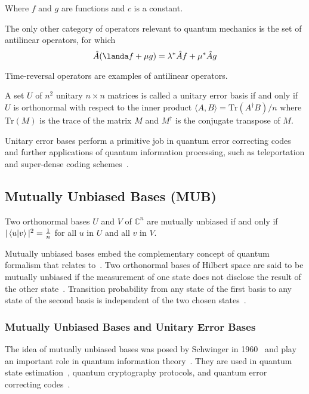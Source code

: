 Where $f$ and $g$ are functions and $c$ is a constant.

The only other category of operators relevant to quantum mechanics is the set of antilinear operators, for which
\begin{equation}
  \hat{A}(\landa f + \mu g) = \lambda^{*}\hat{A}f + \mu^{*}\hat{A}g
  \label{eq:antilinear}
\end{equation}

Time-reversal operators are examples of antilinear operators.

\begin{definition}
A set $U$ of $n^2$ unitary $n \times n$ matrices is called a unitary error basis if and only if $U$ is orthonormal with respect to the inner product $\langle A, B \rangle = {\textrm{Tr}(A^\dagger B)} / n$ where $\textrm{Tr}(M)$ is the trace of the matrix $M$ and $M^\dagger$ is the conjugate transpose of $M$.
\end{definition}

\noindent Unitary error bases perform a primitive job in quantum error correcting codes and further applications of quantum information processing, such as teleportation and super-dense coding schemes~\cite{klappenecker2003UnitaryErrorBases}.

\subsection{Mutually Unbiased Bases (MUB)}

\begin{definition}
Two orthonormal bases $U$ and $V$ of $\mathbb{C}^n$ are mutually unbiased if and only if $|\braket{u|v}|^2 = \frac{1}{n}$ for all $u$ in $U$ and all $v$ in $V$.
\end{definition}

\noindent Mutually unbiased bases embed the complementary concept of quantum formalism that relates to~\cite{paterek2010ConnectionMutuallyUnbiased}.
Two orthonormal bases of Hilbert space are said to be mutually unbiased if the measurement of one state does not disclose the result of the other state~\cite{song2020ConstructionMutuallyUnbiased}.
Transition probability from any state of the first basis to any state of the second basis is independent of the two chosen states~\cite{song2020ConstructionMutuallyUnbiased}.


\subsubsection*{Mutually Unbiased Bases and Unitary Error Bases}
The idea of mutually unbiased bases was posed by Schwinger in 1960~\cite{schwinger1960UnitaryOperatorBases} and play an important role in quantum information theory~\cite{klappenecker2004ConstructionsMutuallyUnbiased}.
They are used in quantum state estimation~\cite{adamson2008ExperimentalQuantumState, grassl2005TomographyQuantumStates}, quantum cryptography protocols, and quantum error correcting codes~\cite{cerf2002SecurityQuantumKey}.

